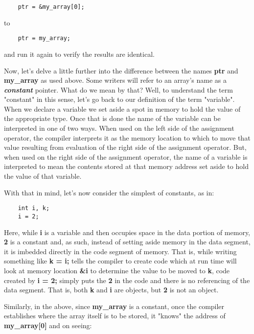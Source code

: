 \begin{verbatim}
    ptr = &my_array[0];
\end{verbatim}

to

\begin{verbatim}
    ptr = my_array;
\end{verbatim}

and run it again to verify the results are identical.

Now, let's delve a little further into the difference between the names
\textbf{ptr} and \textbf{my\_array} as used above. Some writers will
refer to an array's name as a \emph{\textbf{constant}} pointer. What do
we mean by that? Well, to understand the term "constant" in this sense,
let's go back to our definition of the term "variable". When we declare
a variable we set aside a spot in memory to hold the value of the
appropriate type. Once that is done the name of the variable can be
interpreted in one of two ways. When used on the left side of the
assignment operator, the compiler interprets it as the memory location
to which to move that value resulting from evaluation of the right side
of the assignment operator. But, when used on the right side of the
assignment operator, the name of a variable is interpreted to mean the
contents stored at that memory address set aside to hold the value of
that variable.

With that in mind, let's now consider the simplest of constants, as in:

\begin{verbatim}
    int i, k;
    i = 2;
\end{verbatim}

Here, while \textbf{i} is a variable and then occupies space in the data
portion of memory, \textbf{2} is a constant and, as such, instead of
setting aside memory in the data segment, it is imbedded directly in the
code segment of memory. That is, while writing something like \textbf{k
= i;} tells the compiler to create code which at run time will look at
memory location \textbf{\&i} to determine the value to be moved to
\textbf{k}, code created by \textbf{i = 2;} simply puts the \textbf{2}
in the code and there is no referencing of the data segment. That is,
both \textbf{k} and \textbf{i} are objects, but \textbf{2} is not an
object.

Similarly, in the above, since \textbf{my\_array} is a constant, once
the compiler establishes where the array itself is to be stored, it
"knows" the address of \textbf{my\_array{[}0{]}} and on seeing:


